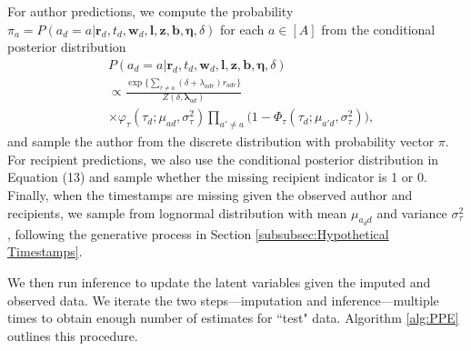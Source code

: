 \documentclass{article}
\begin{document}
For author predictions, we compute the probability $\pi_a = P(a_d=a|\boldsymbol{r}_d, t_d, \boldsymbol{w}_d, \boldsymbol{l}, \boldsymbol{z}, \boldsymbol{b}, \boldsymbol{\eta},\delta)$ for each $a \in [A]$ from the conditional posterior distribution
\begin{equation}
\begin{aligned}
	&P(a_d = a|\boldsymbol{r}_d, t_d, \boldsymbol{w}_d, \boldsymbol{l}, \boldsymbol{z}, \boldsymbol{b}, \boldsymbol{\eta},\delta) \\&\propto \frac{\exp\Big\{\sum\limits_{r \neq a} (\delta+\lambda_{adr})r_{adr}\Big\}}{Z(\delta,\boldsymbol{\lambda}_{ad})}\\&\times\varphi_{\tau}(\tau_{d}; \mu_{ad}, \sigma_\tau^2) \prod
\limits_{a'\neq a}\big(1-\Phi_{\tau}(\tau_{d}; \mu_{a' d}, \sigma_\tau^2) \big),
\end{aligned}
\end{equation}
and sample the author from the discrete distribution with probability vector $\pi$. For recipient predictions, we also use the conditional posterior distribution in Equation (13) and sample whether the missing recipient indicator is 1 or 0. Finally, when the timestamps are missing given the observed author and recipients, we sample from lognormal distribution with mean $\mu_{a_dd}$ and variance $\sigma^2_\tau$, following the generative process in Section \ref{subsubsec:Hypothetical Timestamps}. 

We then run inference to update the latent variables given the imputed and observed data. We iterate the two steps---imputation and inference---multiple times to obtain enough number of estimates for ``test" data. Algorithm \ref{alg:PPE} outlines this procedure.
\end{document}
